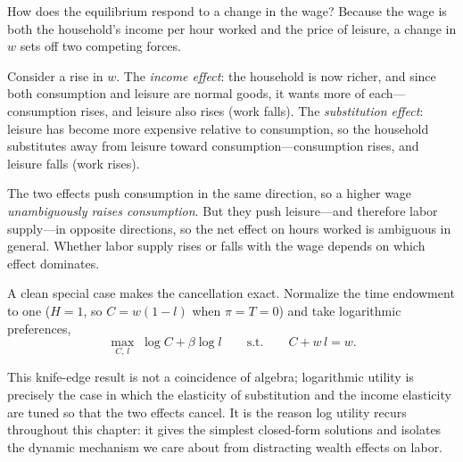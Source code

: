 How does the equilibrium respond to a change in the wage? Because the wage is both the household's income per hour worked and the price of leisure, a change in $w$ sets off two competing forces.

Consider a rise in $w$. The \emph{income effect}: the household is now richer, and since both consumption and leisure are normal goods, it wants more of each---consumption rises, and leisure also rises (work falls). The \emph{substitution effect}: leisure has become more expensive relative to consumption, so the household substitutes away from leisure toward consumption---consumption rises, and leisure falls (work rises).

The two effects push consumption in the same direction, so a higher wage \emph{unambiguously raises consumption}. But they push leisure---and therefore labor supply---in opposite directions, so the net effect on hours worked is ambiguous in general. Whether labor supply rises or falls with the wage depends on which effect dominates.

A clean special case makes the cancellation exact. Normalize the time endowment to one ($H=1$, so $C = w(1-l)$ when $\pi=T=0$) and take logarithmic preferences,
\[
\max_{C,\,l}\; \log C + \beta \log l
\qquad \text{s.t.} \qquad C + w\,l = w.
\]


This knife-edge result is not a coincidence of algebra; logarithmic utility is precisely the case in which the elasticity of substitution and the income elasticity are tuned so that the two effects cancel. It is the reason log utility recurs throughout this chapter: it gives the simplest closed-form solutions and isolates the dynamic mechanism we care about from distracting wealth effects on labor.

